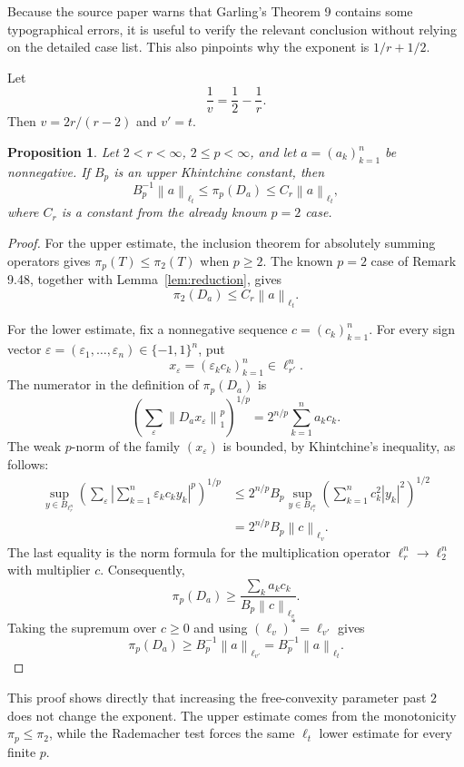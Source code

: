 \documentclass[11pt]{article}
\newtheorem{proposition}[theorem]{Proposition}
\theoremstyle{remark}
\newcommand{\norm}[1]{\left\lVert #1\right\rVert}
\newcommand{\abs}[1]{\left\lvert #1\right\rvert}
\newcommand{\eps}{\varepsilon}
\begin{document}
Because the source paper warns that Garling's Theorem 9 contains some
typographical errors, it is useful to verify the relevant conclusion without
relying on the detailed case list.  This also pinpoints why the exponent is
$1/r+1/2$.

Let
\[
 \frac1v=\frac12-\frac1r.
\]
Then $v=2r/(r-2)$ and $v'=t$.

\begin{proposition}
\label{prop:direct}
Let $2<r<\infty$, $2\le p<\infty$, and let $a=(a_k)_{k=1}^n$ be
nonnegative.  If $B_p$ is an upper Khintchine constant, then
\[
 B_p^{-1}\norm{a}_{\ell_t}
 \le \pi_p(D_a)
 \le C_r\norm{a}_{\ell_t},
\]
where $C_r$ is a constant from the already known $p=2$ case.
\end{proposition}

\begin{proof}
For the upper estimate, the inclusion theorem for absolutely summing
operators gives $\pi_p(T)\le\pi_2(T)$ when $p\ge2$.  The known $p=2$
case of Remark 9.48, together with Lemma~\ref{lem:reduction}, gives
\[
 \pi_2(D_a)\le C_r\norm{a}_{\ell_t}.
\]

For the lower estimate, fix a nonnegative sequence $c=(c_k)_{k=1}^n$.
For every sign vector $\eps=(\eps_1,\ldots,\eps_n)\in\{-1,1\}^n$, put
\[
 x_{\eps}=(\eps_kc_k)_{k=1}^n\in\ell_{r'}^n.
\]
The numerator in the definition of $\pi_p(D_a)$ is
\[
 \left(\sum_{\eps}\norm{D_ax_{\eps}}_1^p\right)^{1/p}
 =2^{n/p}\sum_{k=1}^n a_kc_k.
\]
The weak $p$-norm of the family $(x_{\eps})$ is bounded, by
Khintchine's inequality, as follows:
\begin{align*}
 \sup_{y\in B_{\ell_r^n}}
 \left(\sum_{\eps}
   \abs{\sum_{k=1}^n \eps_kc_ky_k}^{p}\right)^{1/p}
 &\le 2^{n/p}B_p
 \sup_{y\in B_{\ell_r^n}}
 \left(\sum_{k=1}^n c_k^2\abs{y_k}^2\right)^{1/2}\\
 &=2^{n/p}B_p\norm{c}_{\ell_v}.
\end{align*}
The last equality is the norm formula for the multiplication operator
$\ell_r^n\to\ell_2^n$ with multiplier $c$.  Consequently,
\[
 \pi_p(D_a)
 \ge \frac{\sum_k a_kc_k}{B_p\norm{c}_{\ell_v}}.
\]
Taking the supremum over $c\ge0$ and using $(\ell_v)^*=\ell_{v'}$
gives
\[
 \pi_p(D_a)\ge B_p^{-1}\norm{a}_{\ell_{v'}}
 =B_p^{-1}\norm{a}_{\ell_t}.
\]
\end{proof}

This proof shows directly that increasing the free-convexity parameter past
$2$ does not change the exponent.  The upper estimate comes from the
monotonicity $\pi_p\le\pi_2$, while the Rademacher test forces the same
$\ell_t$ lower estimate for every finite $p$.
\end{document}
